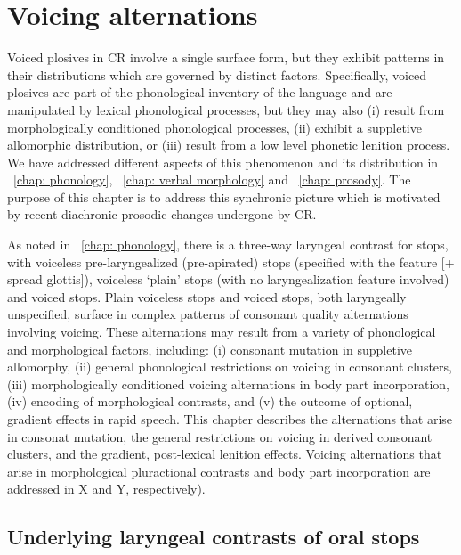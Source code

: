 \chapter{Voicing alternations}
\label{chap: voicing alternations}

Voiced plosives in CR involve a single surface form, but they exhibit patterns in their distributions which are governed by distinct factors. Specifically, voiced plosives are part of the phonological inventory of the language and are manipulated by lexical phonological processes, but they may also (i) result from morphologically conditioned phonological processes, (ii) exhibit a suppletive allomorphic distribution, or (iii) result from a low level phonetic lenition process. We have addressed different aspects of this phenomenon and its distribution in ~\ref{chap: phonology}, ~\ref{chap: verbal morphology} and ~\ref{chap: prosody}. The purpose of this chapter is to address this synchronic picture which is motivated by recent diachronic prosodic changes undergone by CR.

As noted in ~\ref{chap: phonology}, there is a three-way laryngeal contrast for stops, with voiceless pre-laryngealized (pre-apirated) stops (specified with the feature [+ spread glottis]), voiceless ‘plain’ stops (with no laryngealization feature involved) and voiced stops. Plain voiceless stops and voiced stops, both laryngeally unspecified, surface in complex patterns of consonant quality alternations involving voicing. These alternations may result from a variety of phonological and morphological factors, including: (i) consonant mutation in suppletive allomorphy, (ii) general phonological restrictions on voicing in consonant clusters, (iii) morphologically conditioned voicing alternations in body part incorporation, (iv) encoding of morphological contrasts, and (v) the outcome of optional, gradient effects in rapid speech. This chapter describes the alternations that arise in consonat mutation, the general restrictions on voicing in derived consonant clusters, and the gradient, post-lexical lenition effects. Voicing alternations that arise in morphological pluractional contrasts and body part incorporation are addressed in X and Y, respectively).

\section{Underlying laryngeal contrasts of oral stops}
\label{sec: underlying laryngeal contrasts}

